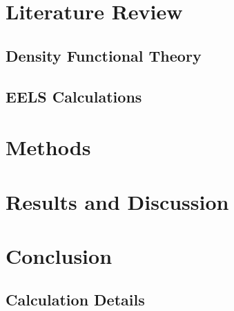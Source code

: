 \documentclass[12pt]{report}
\begin{document}



\chapter{Literature Review}\label{literature_review}

\section{Density Functional Theory}\label{dft_section}

\section{EELS Calculations}\label{ELNES_section}

\chapter{Methods}\label{methods}

\chapter{Results and Discussion}\label{results}

\chapter{Conclusion}\label{conclusion}


\begin{appendices}

\chapter{Calculation Details} \label{calc_details}






\end{appendices}







\end{document}

